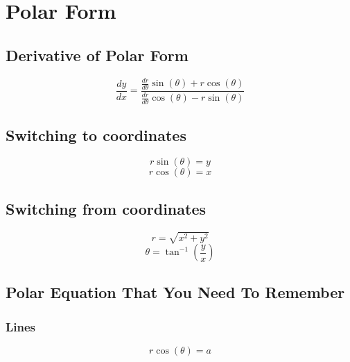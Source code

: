 \section{Polar Form}

\subsection{Derivative of Polar Form}
\begin{equation}
    \frac{dy}{dx}=\frac{\frac{dr}{d\theta}\sin{(\theta)}+r\cos{(\theta)}}{\frac{dr}{d\theta}\cos{(\theta)}-r\sin{(\theta)}}
\end{equation}

\subsection{Switching to coordinates}
\begin{equation}
    r\sin{(\theta)}=y
\end{equation}
\begin{equation}
    r\cos{(\theta)}=x
\end{equation}

\subsection{Switching from coordinates}
\begin{equation}
    r=\sqrt{x^2+y^2}
\end{equation}
\begin{equation}
    \theta=\tan^{-1}{\left(\frac{y}{x}\right)}
\end{equation}

\subsection{Polar Equation That You Need To Remember}
\subsubsection{Lines}
    \begin{equation}
        r\cos{(\theta)}=a
    \end{equation}
    
